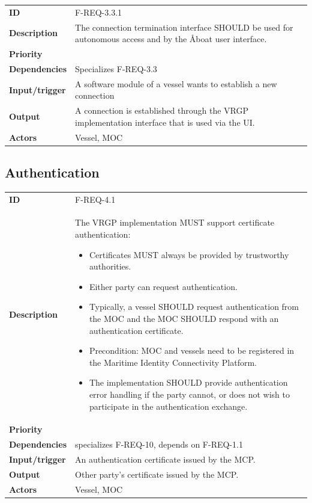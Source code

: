 \begin{table}[H]
	\centering
	\begin{tabularx}{\textwidth}{ l X }
		\rowcolor[HTML]{E7E7E7}
		\textbf{ID} & F-REQ-3.3.1 \\
		\textbf{Description} & The connection termination interface SHOULD be used for autonomous access and by the Åboat user interface. \\
		\rowcolor[HTML]{E7E7E7}
		\textbf{Priority} & \priohigh \\
		\textbf{Dependencies} & Specializes F-REQ-3.3 \\
		\rowcolor[HTML]{E7E7E7}
		\textbf{Input/trigger} & A software module of a vessel wants to establish a new connection \\
		\textbf{Output} & A connection is established through the VRGP implementation interface that is used via the UI. \\
		\rowcolor[HTML]{E7E7E7}
		\textbf{Actors} & Vessel, MOC \\
	\end{tabularx}
	\label{table:f-req-3.3.1}
\end{table}

\subsection{Authentication}

\begin{table}[H]
	\centering
	\begin{tabularx}{\textwidth}{ l X }
		\rowcolor[HTML]{E7E7E7}
		\textbf{ID} & F-REQ-4.1 \\
		\textbf{Description} & The VRGP implementation MUST support certificate authentication:
			\begin{itemize}
				\item Certificates MUST always be provided by trustworthy authorities.
				\item Either party can request authentication.
				\item Typically, a vessel SHOULD request authentication from the MOC and the MOC SHOULD respond with an authentication certificate.
				\item Precondition: MOC and vessels need to be registered in the Maritime Identity Connectivity Platform.
				\item The implementation SHOULD provide authentication error handling if the party cannot, or does not wish to participate in the authentication exchange.
			\end{itemize} \\
		\rowcolor[HTML]{E7E7E7}
		\textbf{Priority} & \priohigh \\
		\textbf{Dependencies} & specializes F-REQ-10, depends on F-REQ-1.1 \\
		\rowcolor[HTML]{E7E7E7}
		\textbf{Input/trigger} & An authentication certificate issued by the MCP. \\
		\textbf{Output} & Other party’s certificate issued by the MCP. \\
		\rowcolor[HTML]{E7E7E7}
		\textbf{Actors} & Vessel, MOC \\
	\end{tabularx}
	\label{table:f-req-4.1}
\end{table}

